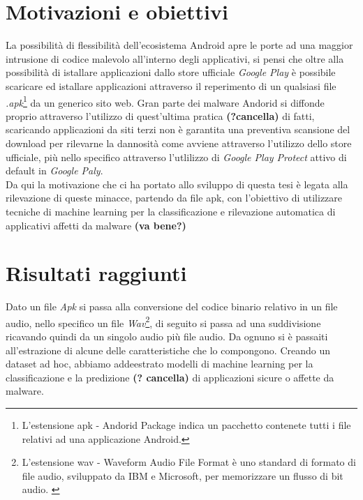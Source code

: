 
\section{Motivazioni e obiettivi}
\label{sec:intro2}
La possibilità di flessibilità dell'ecosistema Android apre le porte ad una maggior intrusione di codice malevolo all'interno degli applicativi, si pensi che oltre alla possibilità di istallare applicazioni dallo store ufficiale \textit{Google Play} è possibile scaricare ed istallare applicazioni attraverso il reperimento di un qualsiasi file \textit{.apk}\footnote{L'estensione apk - Andorid Package indica un pacchetto contenete tutti i file relativi ad una applicazione Android.} da un generico sito web. Gran parte dei malware Andorid si diffonde proprio attraverso l'utilizzo di quest'ultima pratica \textbf{(?cancella)} di fatti, scaricando applicazioni da siti terzi non è garantita una preventiva scansione del download per rilevarne la dannosità come avviene attraverso l'utilizzo dello store ufficiale, più nello specifico attraverso l'utlilizzo di \textit{Google Play Protect} attivo di default in \textit{Google Paly}.
\\Da qui la motivazione che ci ha portato allo sviluppo di questa tesi è legata alla rilevazione di queste minacce, partendo da file apk, con l'obiettivo di utilizzare tecniche di machine learning per la classificazione e rilevazione automatica di applicativi affetti da malware \textbf{(va bene?)} 



\section{Risultati raggiunti}
\label{sec:intro3}
Dato un file \textit{Apk} si passa alla conversione del codice binario relativo in un file audio, nello specifico un file \textit{Wav}\footnote{L'estensione wav - Waveform Audio File Format è uno standard di formato di file audio, sviluppato da IBM e Microsoft, per memorizzare un flusso di bit audio. \cite{enwiki:1020662001}}, di seguito si passa ad una suddivisione ricavando quindi da un singolo audio più file audio. Da ognuno si è passaiti all'estrazione di alcune delle caratteristiche che lo compongono. Creando un dataset ad hoc, abbiamo addeestrato modelli di machine learning per la classificazione e la predizione \textbf{(? cancella)} di applicazioni sicure o affette da malware. 


